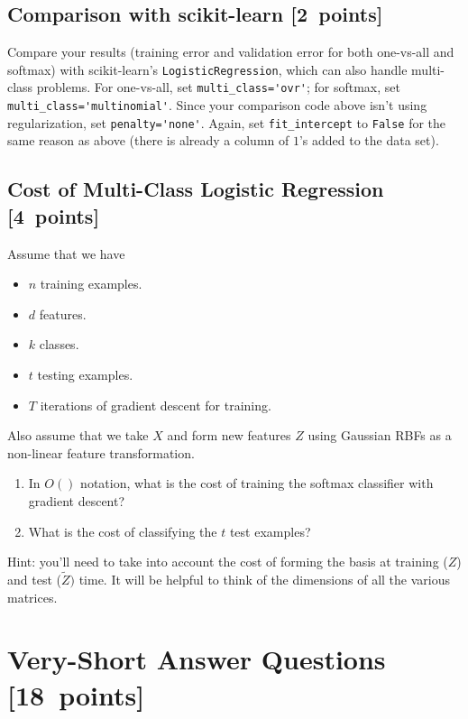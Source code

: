 \documentclass{article}
\newcommand{\blu}[1]{{\textcolor{blu}{#1}}}
\let\ask\blu
\newcommand\pts[1]{\textcolor{pointscolour}{[#1~points]}}
\begin{document}
\subsection{Comparison with scikit-learn \pts{2}}
\ask{Compare your results (training error and validation error for both one-vs-all and softmax) with scikit-learn's \texttt{LogisticRegression}},
which can also handle multi-class problems.
For one-vs-all, set \verb|multi_class='ovr'|; for softmax, set \verb|multi_class='multinomial'|.
Since your comparison code above isn't using regularization, set \verb|penalty='none'|.
Again, set \verb|fit_intercept| to \verb|False| for the same reason as above (there is already a column of $1$'s added to the data set).

\subsection{Cost of Multi-Class Logistic Regression \pts{4}}

Assume that we have
\begin{itemize}
    \item $n$ training examples.
    \item $d$ features.
    \item $k$ classes.
    \item $t$ testing examples.
    \item $T$ iterations of gradient descent for training.
\end{itemize}
Also assume that we take $X$ and form new features $Z$ using Gaussian RBFs as a non-linear feature transformation.
\begin{enumerate}
\item \ask{In $O()$ notation, what is the cost of training the softmax classifier with gradient descent?}
\item \ask{What is the cost of classifying the $t$ test examples?}
\end{enumerate}
Hint: you'll need to take into account the cost of forming the basis at training ($Z$) and test ($\tilde{Z})$ time. It will be helpful to think of the dimensions of all the various matrices.



\clearpage
\section{Very-Short Answer Questions \pts{18}}
\end{document}
